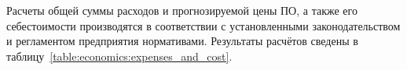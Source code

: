 





Расчеты общей суммы расходов и прогнозируемой цены ПО, а также его себестоимости производятся в соответствии с установленными законодательством и регламентом предприятия нормативами. Результаты расчётов сведены в таблицу~\ref{table:economics:expenses_and_cost}.


